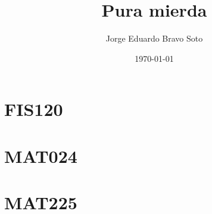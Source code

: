 \documentclass{article}
\title{Pura mierda}
\author{Jorge Eduardo Bravo Soto}
\date{\today}
\theoremstyle{plain}
\theoremstyle{definition}
\begin{document}
\maketitle
\tableofcontents

\section{FIS120}


\section{MAT024}


\section{MAT225}

\end{document}
